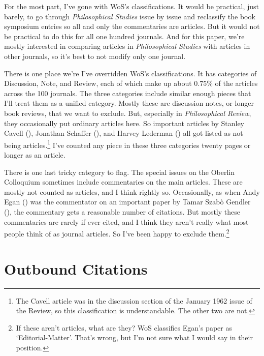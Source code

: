 \documentclass[
  10pt,
  letterpaper,
  DIV=11,
  numbers=noendperiod,
  twoside]{scrartcl}
\begin{document}
For the most part, I've gone with WoS's classifications. It would be
practical, just barely, to go through \emph{Philosophical Studies} issue
by issue and reclassify the book symposium entries so all and only the
commentaries are articles. But it would not be practical to do this for
all one hundred journals. And for this paper, we're mostly interested in
comparing articles in \emph{Philosophical Studies} with articles in
other journals, so it's best to not modify only one journal.

There is one place we're I've overridden WoS's classifications. It has
categories of Discussion, Note, and Review, each of which make up about
0.75\% of the articles across the 100 journals. The three categories
include similar enough pieces that I'll treat them as a unified
category. Mostly these are discussion notes, or longer book reviews,
that we want to exclude. But, especially in \emph{Philosophical Review},
they occasionally put ordinary articles here. So important articles by
Stanley Cavell (), Jonathan
Schaffer (), and Harvey Lederman
() all got listed as not being
articles.\footnote{The Cavell article was in the discussion section of
  the January 1962 issue of the Review, so this classification is
  understandable. The other two are not.} I've counted any piece in
these three categories twenty pages or longer as an article.

There is one last tricky category to flag. The special issues on the
Oberlin Colloquium sometimes include commentaries on the main articles.
These are mostly not counted as articles, and I think rightly so.
Occasionally, as when Andy Egan () was the
commentator on an important paper by Tamar Szabò Gendler
(), the commentary gets a
reasonable number of citations. But mostly these commentaries are rarely
if ever cited, and I think they aren't really what most people think of
as journal articles. So I've been happy to exclude them.\footnote{If
  these aren't articles, what are they? WoS classifies Egan's paper as
  `Editorial-Matter'. That's wrong, but I'm not sure what I would say in
  their position.}

\section{Outbound Citations}\label{sec-outbound}
\end{document}
